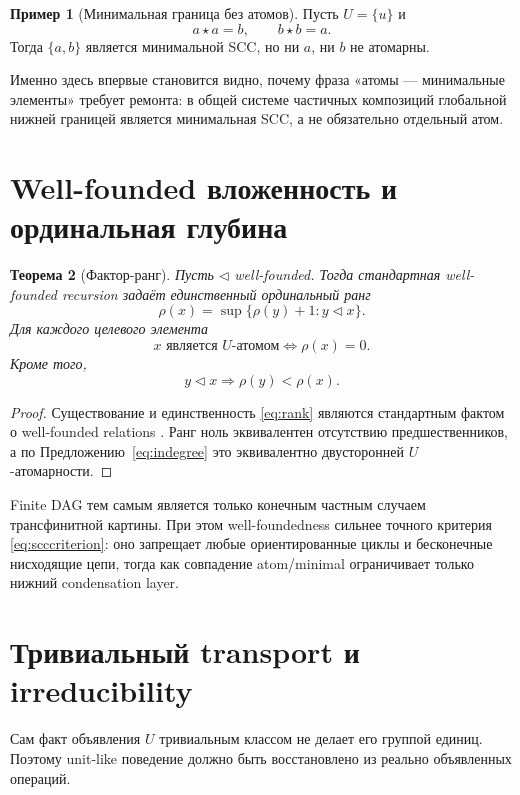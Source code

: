 \documentclass[11pt]{article}
\newtheorem{theorem}{Теорема}[section]
\theoremstyle{definition}
\newtheorem{example}[theorem]{Пример}
\theoremstyle{remark}
\begin{document}
\begin{example}[Минимальная граница без атомов]
Пусть \(U=\{u\}\) и
\[
a\star a=b,\qquad b\star b=a.
\]
Тогда \(\{a,b\}\) является минимальной SCC, но ни \(a\), ни \(b\) не атомарны.
\end{example}

Именно здесь впервые становится видно, почему фраза «атомы — минимальные элементы» требует ремонта: в общей системе частичных композиций глобальной нижней границей является минимальная SCC, а не обязательно отдельный атом.

\section{Well-founded вложенность и ординальная глубина}

\begin{theorem}[Фактор-ранг]
Пусть \(\triangleleft\) well-founded. Тогда стандартная well-founded recursion задаёт единственный ординальный ранг
\begin{equation}
\rho(x)=\sup\{\rho(y)+1:y\triangleleft x\}.
\label{eq:rank}
\end{equation}
Для каждого целевого элемента
\begin{equation}
\boxed{x\text{ является }U\text{-атомом}\iff\rho(x)=0.}
\label{eq:rankzero}
\end{equation}
Кроме того,
\[
y\triangleleft x\Longrightarrow\rho(y)<\rho(x).
\]
\end{theorem}

\begin{proof}
Существование и единственность \eqref{eq:rank} являются стандартным фактом о well-founded relations \cite{Jech2003}. Ранг ноль эквивалентен отсутствию предшественников, а по Предложению~\ref{eq:indegree} это эквивалентно двусторонней \(U\)-атомарности.
\end{proof}

Finite DAG тем самым является только конечным частным случаем трансфинитной картины. При этом well-foundedness сильнее точного критерия \eqref{eq:scccriterion}: оно запрещает любые ориентированные циклы и бесконечные нисходящие цепи, тогда как совпадение atom/minimal ограничивает только нижний condensation layer.

\section{Тривиальный transport и irreducibility}

Сам факт объявления \(U\) тривиальным классом не делает его группой единиц. Поэтому unit-like поведение должно быть восстановлено из реально объявленных операций.
\end{document}
